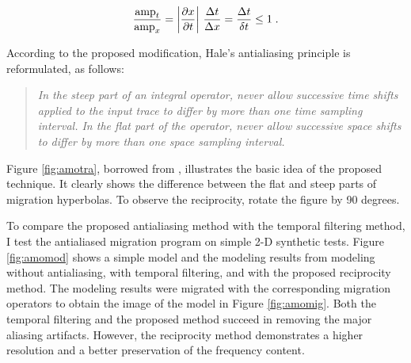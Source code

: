 \begin{equation}
{\mbox{amp}_t \over \mbox{amp}_x}=
\left|{\partial x \over \partial t}\right|\,{\Delta t \over \Delta x}=
{\Delta t \over \delta t} \leq 1\;.
\label{eqn:Jacobian}
\end{equation}

According to the proposed modification, Hale's antialiasing principle
is reformulated, as follows:
\begin{quote}
{\em In the steep part of an integral operator, never allow successive
time shifts applied to the input trace to differ by more than one time
sampling interval. In the flat part of the operator, never allow
successive space shifts to differ by more than one space sampling
interval.}
\end{quote}


Figure \ref{fig:amotra}, borrowed from ,
illustrates the basic idea of the proposed technique. It clearly shows
the difference between the flat and steep parts of migration
hyperbolas. To observe the reciprocity, rotate the figure by 90
degrees.


To compare the proposed antialiasing method with the temporal
filtering method, I test the antialiased migration program on simple
2-D synthetic tests. Figure \ref{fig:amomod} shows a simple model and
the modeling results from modeling without antialiasing, with temporal
filtering, and with the proposed reciprocity method.  The modeling
results were migrated with the corresponding migration operators to
obtain the image of the model in Figure \ref{fig:amomig}.  Both the
temporal filtering and the proposed method succeed in removing the
major aliasing artifacts. However, the reciprocity method demonstrates
a higher resolution and a better preservation of the frequency
content.



